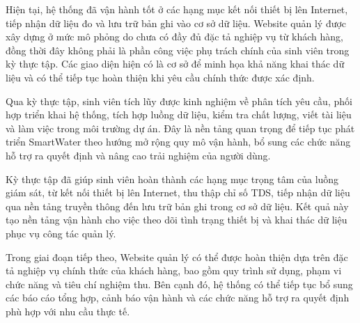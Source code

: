 Hiện tại, hệ thống đã vận hành tốt ở các hạng mục kết nối thiết bị lên Internet, tiếp nhận dữ liệu đo và lưu trữ bản ghi vào cơ sở dữ liệu. Website quản lý được xây dựng ở mức mô phỏng do chưa có đầy đủ đặc tả nghiệp vụ từ khách hàng, đồng thời đây không phải là phần công việc phụ trách chính của sinh viên trong kỳ thực tập. Các giao diện hiện có là cơ sở để minh họa khả năng khai thác dữ liệu và có thể tiếp tục hoàn thiện khi yêu cầu chính thức được xác định.

Qua kỳ thực tập, sinh viên tích lũy được kinh nghiệm về phân tích yêu cầu, phối hợp triển khai hệ thống, tích hợp luồng dữ liệu, kiểm tra chất lượng, viết tài liệu và làm việc trong môi trường dự án. Đây là nền tảng quan trọng để tiếp tục phát triển SmartWater theo hướng mở rộng quy mô vận hành, bổ sung các chức năng hỗ trợ ra quyết định và nâng cao trải nghiệm của người dùng.


Kỳ thực tập đã giúp sinh viên hoàn thành các hạng mục trọng tâm của luồng giám sát, từ kết nối thiết bị lên Internet, thu thập chỉ số TDS, tiếp nhận dữ liệu qua nền tảng truyền thông đến lưu trữ bản ghi trong cơ sở dữ liệu. Kết quả này tạo nền tảng vận hành cho việc theo dõi tình trạng thiết bị và khai thác dữ liệu phục vụ công tác quản lý.

Trong giai đoạn tiếp theo, Website quản lý có thể được hoàn thiện dựa trên đặc tả nghiệp vụ chính thức của khách hàng, bao gồm quy trình sử dụng, phạm vi chức năng và tiêu chí nghiệm thu. Bên cạnh đó, hệ thống có thể tiếp tục bổ sung các báo cáo tổng hợp, cảnh báo vận hành và các chức năng hỗ trợ ra quyết định phù hợp với nhu cầu thực tế.
